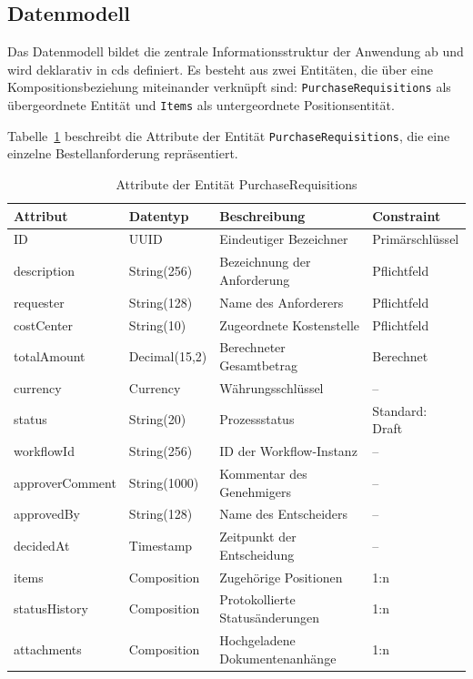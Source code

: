\subsection{Datenmodell}
\label{subsec:datenmodell}

Das Datenmodell bildet die zentrale Informationsstruktur der Anwendung ab und wird deklarativ in \gls{cds} definiert. Es besteht aus zwei Entitäten, die über eine Kompositionsbeziehung miteinander verknüpft sind: \texttt{PurchaseRequisitions} als übergeordnete Entität und \texttt{Items} als untergeordnete Positionsentität.

Tabelle~\ref{tab:entity-purchaserequisitions} beschreibt die Attribute der Entität \texttt{PurchaseRequisitions}, die eine einzelne Bestellanforderung repräsentiert.

\begin{table}[H]
  \centering
  \caption{Attribute der Entität PurchaseRequisitions}
  \label{tab:entity-purchaserequisitions}
  \begin{tabularx}{\textwidth}{l l X l}
    \hline
    \textbf{Attribut} & \textbf{Datentyp} & \textbf{Beschreibung} & \textbf{Constraint} \\
    \hline
    ID            & UUID            & Eindeutiger Bezeichner       & Primärschlüssel \\
    description   & String(256)     & Bezeichnung der Anforderung  & Pflichtfeld \\
    requester     & String(128)     & Name des Anforderers         & Pflichtfeld \\
    costCenter    & String(10)      & Zugeordnete Kostenstelle     & Pflichtfeld \\
    totalAmount   & Decimal(15,2)   & Berechneter Gesamtbetrag     & Berechnet \\
    currency      & Currency        & Währungsschlüssel            & -- \\
    status        & String(20)      & Prozessstatus                & Standard: Draft \\
    workflowId    & String(256)     & ID der Workflow-Instanz      & -- \\
    approverComment & String(1000)  & Kommentar des Genehmigers    & -- \\
    approvedBy    & String(128)     & Name des Entscheiders        & -- \\
    decidedAt     & Timestamp       & Zeitpunkt der Entscheidung   & -- \\
    items         & Composition     & Zugehörige Positionen        & 1:n \\
    statusHistory & Composition     & Protokollierte Statusänderungen & 1:n \\
    attachments   & Composition     & Hochgeladene Dokumentenanhänge & 1:n \\
    \hline
  \end{tabularx}
\end{table}

